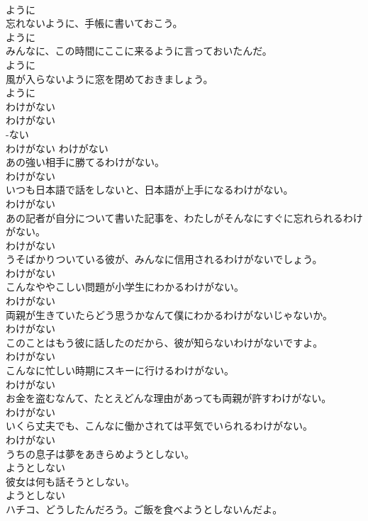 \documentclass[8pt]{extreport}
\begin{document}
\begin{CJK}{UTF8}{min}
\\	ように
\\	忘れないように、手帳に書いておこう。	
\\	ように
\\	みんなに、この時間にここに来るように言っておいたんだ。	
\\	ように
\\	風が入らないように窓を閉めておきましょう。	
\\	ように
\\	わけがない	
\\	わけがない	
\\	-ない
\\	わけがない	わけがない
\\	あの強い相手に勝てるわけがない。	
\\	わけがない
\\	いつも日本語で話をしないと、日本語が上手になるわけがない。	
\\	わけがない
\\	あの記者が自分について書いた記事を、わたしがそんなにすぐに忘れられるわけがない。	
\\	わけがない
\\	うそばかりついている彼が、みんなに信用されるわけがないでしょう。	
\\	わけがない
\\	こんなややこしい問題が小学生にわかるわけがない。	
\\	わけがない
\\	両親が生きていたらどう思うかなんて僕にわかるわけがないじゃないか。	
\\	わけがない
\\	このことはもう彼に話したのだから、彼が知らないわけがないですよ。	
\\	わけがない
\\	こんなに忙しい時期にスキーに行けるわけがない。	
\\	わけがない
\\	お金を盗むなんて、たとえどんな理由があっても両親が許すわけがない。	
\\	わけがない
\\	いくら丈夫でも、こんなに働かされては平気でいられるわけがない。	
\\	わけがない
\\	うちの息子は夢をあきらめようとしない。	
\\	ようとしない
\\	彼女は何も話そうとしない。	
\\	ようとしない
\\	ハチコ、どうしたんだろう。ご飯を食べようとしないんだよ。	

\end{CJK}
\end{document}
